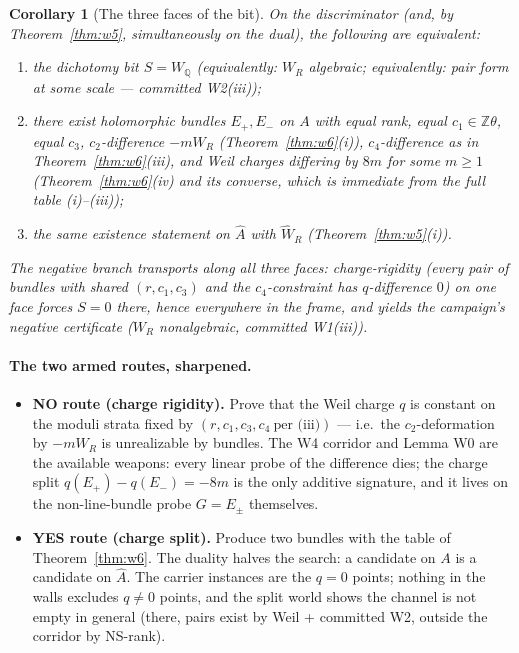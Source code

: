 \documentclass[11pt]{article}
\newtheorem{corollary}[theorem]{Corollary}
\theoremstyle{definition}
\newcommand{\Q}{\mathbb{Q}}
\newcommand{\Z}{\mathbb{Z}}
\begin{document}
\begin{corollary}[The three faces of the bit]\label{cor:frame}
On the discriminator (and, by Theorem~\ref{thm:w5}, simultaneously on the
dual), the following are equivalent:
\begin{enumerate}
\item[(a)] the dichotomy bit $S=W_\Q$ (equivalently: $W_R$ algebraic;
equivalently: pair form at some scale --- committed W2(iii));
\item[(b)] there exist holomorphic bundles $E_+,E_-$ on $A$ with equal rank,
equal $c_1\in\Z\theta$, equal $c_3$, $c_2$-difference $-mW_R$
(Theorem~\ref{thm:w6}(i)), $c_4$-difference as in
Theorem~\ref{thm:w6}(iii), and Weil charges differing by $8m$ for some
$m\ge 1$ (Theorem~\ref{thm:w6}(iv) and its converse, which is immediate from
the full table (i)--(iii));
\item[(c)] the same existence statement on $\widehat A$ with
$\widehat W_R$ (Theorem~\ref{thm:w5}(i)).
\end{enumerate}
The negative branch transports along all three faces: charge-rigidity
(every pair of bundles with shared $(r,c_1,c_3)$ and the $c_4$-constraint has
$q$-difference $0$) on \emph{one} face forces $S=0$ there, hence everywhere
in the frame, and yields the campaign's negative certificate
($W_R$ nonalgebraic, committed W1(iii)).
\end{corollary}

\paragraph{The two armed routes, sharpened.}
\begin{itemize}
\item \textbf{NO route (charge rigidity).} Prove that the Weil charge
$q$ is constant on the moduli strata fixed by $(r,c_1,c_3,c_4\ \text{per
(iii)})$ --- i.e.\ the $c_2$-deformation by $-mW_R$ is unrealizable by
bundles. The W4 corridor and Lemma W0 are the available weapons: every
linear probe of the difference dies; the charge split
$q(E_+)-q(E_-)=-8m$ is the only additive signature, and it lives on the
non-line-bundle probe $G=E_\pm$ themselves.
\item \textbf{YES route (charge split).} Produce two bundles with the
table of Theorem~\ref{thm:w6}. The duality halves the search: a candidate on
$A$ is a candidate on $\widehat A$. The carrier instances are the $q=0$
points; nothing in the walls excludes $q\ne 0$ points, and the split world
shows the channel is not empty in general (there, pairs exist by Weil +
committed W2, outside the corridor by NS-rank).
\end{itemize}
\end{document}
